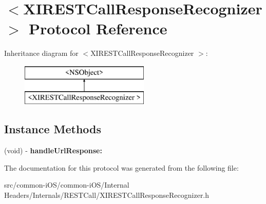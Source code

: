 \hypertarget{protocol_x_i_r_e_s_t_call_response_recognizer_01-p}{}\section{$<$X\+I\+R\+E\+S\+T\+Call\+Response\+Recognizer $>$ Protocol Reference}
\label{protocol_x_i_r_e_s_t_call_response_recognizer_01-p}
Inheritance diagram for $<$X\+I\+R\+E\+S\+T\+Call\+Response\+Recognizer $>$\+:\begin{figure}[H]
\begin{center}
\leavevmode
\includegraphics[height=2.000000cm]{protocol_x_i_r_e_s_t_call_response_recognizer_01-p}
\end{center}
\end{figure}
\subsection*{Instance Methods}
\begin{DoxyCompactItemize}
\item 
\hypertarget{protocol_x_i_r_e_s_t_call_response_recognizer_01-p_adbd50c631e81355cdae2b635f0b3c296}{}\label{protocol_x_i_r_e_s_t_call_response_recognizer_01-p_adbd50c631e81355cdae2b635f0b3c296} 
(void) -\/ {\bfseries handle\+Url\+Response\+:}
\end{DoxyCompactItemize}


The documentation for this protocol was generated from the following file\+:\begin{DoxyCompactItemize}
\item 
src/common-\/i\+O\+S/common-\/i\+O\+S/\+Internal Headers/\+Internals/\+R\+E\+S\+T\+Call/X\+I\+R\+E\+S\+T\+Call\+Response\+Recognizer.\+h\end{DoxyCompactItemize}

